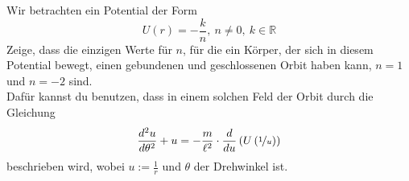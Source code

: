 \begin{Exercise}[label = bertrand, origin = Aaron Wild, difficulty = 5, title = Betrands Theorem]
	Wir betrachten ein Potential der Form
	\begin{equation}
		U\left(r\right) = -\frac{k}{n},~n \neq 0, ~k \in \mathbb{R}
	\end{equation}
	Zeige, dass die einzigen Werte für $n$, für die ein Körper, der sich in diesem Potential bewegt, einen gebundenen und geschlossenen Orbit haben kann, $n = 1$ und $n=-2$ sind.\\
	Dafür kannst du benutzen, dass in einem solchen Feld der Orbit durch die Gleichung
	\begin{equation}\label{bertrand:binet}
		\frac{d^2u}{d\theta^2} + u =- \frac{m}{\ell^2} \cdot \frac{d}{du}\left(U\left(\nicefrac{1}{u}\right)\right)
	\end{equation}
	beschrieben wird, wobei $u:= \frac{1}{r}$ und $\theta$ der Drehwinkel ist.
\end{Exercise}